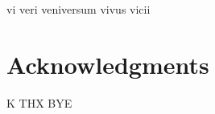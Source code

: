 \chapter*{}

\begin{center}
vi veri veniversum vivus vicii
\end{center}


\chapter*{Acknowledgments}

K THX BYE

\newpage